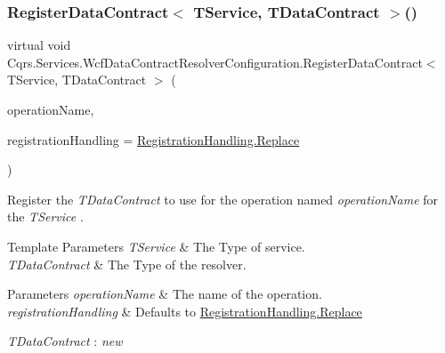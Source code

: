 \subsubsection{\texorpdfstring{Register\+Data\+Contract$<$ T\+Service, T\+Data\+Contract $>$()}{RegisterDataContract< TService, TDataContract >()}}
{\footnotesize\ttfamily virtual void Cqrs.\+Services.\+Wcf\+Data\+Contract\+Resolver\+Configuration.\+Register\+Data\+Contract$<$ T\+Service, T\+Data\+Contract $>$ (\begin{DoxyParamCaption}\item[{string}]{operation\+Name,  }\item[{\hyperlink{classCqrs_1_1Services_1_1WcfDataContractResolverConfiguration_acf6a145eb88c5d98b31a541cfb1fb152_acf6a145eb88c5d98b31a541cfb1fb152}{Registration\+Handling}}]{registration\+Handling = {\ttfamily \hyperlink{classCqrs_1_1Services_1_1WcfDataContractResolverConfiguration_acf6a145eb88c5d98b31a541cfb1fb152_acf6a145eb88c5d98b31a541cfb1fb152a0ebe6df8a3ac338e0512acc741823fdb}{Registration\+Handling.\+Replace}} }\end{DoxyParamCaption})\hspace{0.3cm}{\ttfamily [virtual]}}



Register the {\itshape T\+Data\+Contract}  to use for the operation named {\itshape operation\+Name}  for the {\itshape T\+Service} . 


\begin{DoxyTemplParams}{Template Parameters}
{\em T\+Service} & The Type of service.\\
\hline
{\em T\+Data\+Contract} & The Type of the resolver.\\
\hline
\end{DoxyTemplParams}

\begin{DoxyParams}{Parameters}
{\em operation\+Name} & The name of the operation.\\
\hline
{\em registration\+Handling} & Defaults to \hyperlink{classCqrs_1_1Services_1_1WcfDataContractResolverConfiguration_acf6a145eb88c5d98b31a541cfb1fb152_acf6a145eb88c5d98b31a541cfb1fb152a0ebe6df8a3ac338e0512acc741823fdb}{Registration\+Handling.\+Replace}\\
\hline
\end{DoxyParams}
\begin{Desc}
\item[Type Constraints]\begin{description}
\item[{\em T\+Data\+Contract} : {\em new}]\end{description}
\end{Desc}


